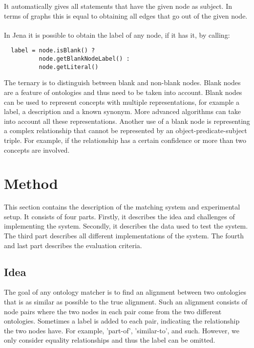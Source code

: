 \documentclass{article}
\begin{document}
 It automatically gives all statements that have the given node as subject. In terms of graphs this is equal to obtaining all edges that go out of the given node.
 \paragraph{}
 In Jena it is possible to obtain the label of any node, if it has it, by calling:
 
 \lstset{language=Java}
 \begin{lstlisting}
  label = node.isBlank() ? 
  		  node.getBlankNodeLabel() : 
  		  node.getLiteral()
 \end{lstlisting}
 
 The ternary is to distinguish between blank and non-blank nodes. Blank nodes are a feature of ontologies and thus need to be taken into account. Blank nodes can be used to represent concepts with multiple representations, for example a label, a description and a known synonym. More advanced algorithms can take into account all these representations. Another use of a blank node is representing a complex relationship that cannot be represented by an object-predicate-subject triple. For example, if the relationship has a certain confidence or more than two concepts are involved.
 
 \newpage
 \section{Method} 
 This section contains the description of the matching system and experimental setup. It consists of four parts. Firstly, it describes the idea and challenges of implementing the system. Secondly, it describes the data used to test the system. The third part describes all different implementations of the system. The fourth and last part describes the evaluation criteria.
 
 \subsection{Idea}
The goal of any ontology matcher is to find an alignment between two ontologies that is as similar as possible to the true alignment. Such an alignment consists of node pairs where the two nodes in each pair come from the two different ontologies. Sometimes a label is added to each pair, indicating the relationship the two nodes have. For example, 'part-of', 'similar-to', and such. However, we only consider equality relationships and thus the label can be omitted.
\end{document}
